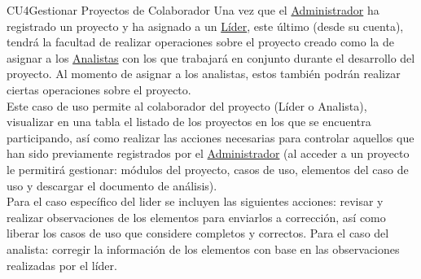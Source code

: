 	\begin{UseCase}{CU4}{Gestionar Proyectos de Colaborador}{
		Una vez que el \hyperlink{admin}{Administrador} ha registrado un proyecto y ha asignado a un \hyperlink{jefe}{Líder}, este último (desde su cuenta), tendrá la facultad de realizar operaciones sobre el proyecto creado como la de asignar a los \hyperlink{analista}{Analistas} con los que trabajará en conjunto durante el desarrollo del proyecto. Al momento de asignar a los analistas, estos también podrán realizar ciertas operaciones sobre el proyecto.\\
		
		Este caso de uso permite al colaborador del proyecto (Líder o Analista), visualizar en una tabla el listado de los proyectos en los que se encuentra participando, así como realizar las acciones necesarias para controlar aquellos que han sido previamente registrados por el \hyperlink{admin}{Administrador} (al acceder a un proyecto le permitirá gestionar: módulos del proyecto, casos de uso, elementos del caso de uso y descargar el documento de análisis).\\
		
		Para el caso específico del lider se incluyen las siguientes acciones: revisar y realizar observaciones de los elementos para enviarlos a corrección, así como liberar los casos de uso que considere completos y correctos. Para el caso del analista: corregir la información de los elementos con base en las observaciones realizadas por el líder. \\
	}
\end{UseCase}

